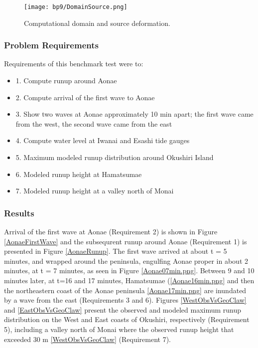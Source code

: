 \begin{figure}[ht]
\hfil\texttt{[image: bp9/DomainSource.png]}\hfil
\caption{\label{DomainSource}
Computational domain and source deformation.
  }
\end{figure} 

\subsubsection{Problem Requirements}
  Requirements of this benchmark test were to:
\begin{itemize}
\item 1. Compute runup around Aonae
\item 2. Compute arrival of the first wave to Aonae
\item 3. Show two waves at Aonae approximately 10 min apart; the first wave came from the west, the second wave came from the east
\item 4. Compute water level at Iwanai and Esashi tide gauges
\item 5. Maximum modeled runup distribution around Okushiri Island
\item 6. Modeled runup height at Hamatsumae
\item 7. Modeled runup height at a valley north of Monai
\end{itemize}

\subsubsection{Results}

  Arrival of the first wave at Aonae (Requirement 2) is shown in Figure \ref{AonaeFirstWave} and the subsequrent runup around Aonae (Requirement 1) is presented in Figure \ref{AonaeRunup}.  The first wave arrived at about t = 5 minutes, and wrapped around the peninsula, engulfing Aonae proper in about 2 minutes, at t = 7 minutes, as seen in Figure \ref{Aonae07min.png}.  Between 9 and 10 minutes later, at t=16 and 17 minutes, Hamatsumae (\ref{Aonae16min.png} and then the northeastern coast of the Aonae peninsula \ref{Aonae17min.png} are inundated by a wave from the east (Requirements 3 and 6).  Figures \ref{WestObsVsGeoClaw} and \ref{EastObsVsGeoClaw} present the observed and modeled maximum runup distribution on the West and East coasts of Okushiri, respectively (Requirement 5), including a valley north of Monai where the observed runup height that exceeded 30 m \ref{WestObsVsGeoClaw} (Requirement 7). 

